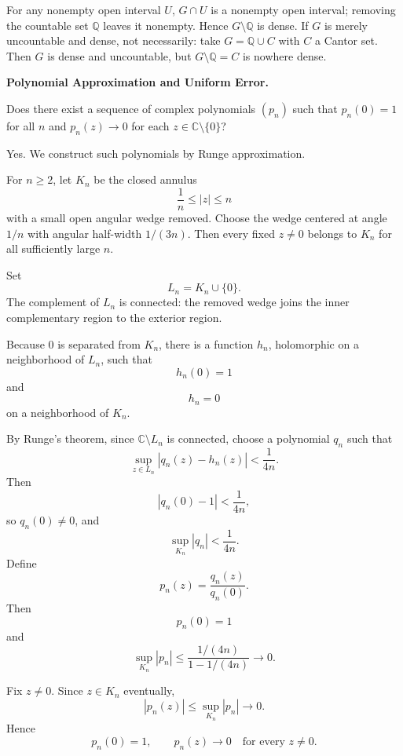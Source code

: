 \begin{solution}
For any nonempty open interval $U$, $G\cap U$ is a nonempty open interval; removing the countable set $\mathbb Q$ leaves it nonempty. Hence $G\setminus\mathbb Q$ is dense.
If $G$ is merely uncountable and dense, not necessarily: take $G=\mathbb Q\cup C$ with $C$ a Cantor set. Then $G$ is dense and uncountable, but $G\setminus\mathbb Q=C$ is nowhere dense.

\bigskip
\end{solution}

\begin{problem}[CP-II-0170]
\label{prob:cp-ii-0170}
\textbf{Polynomial Approximation and Uniform Error.}

	Does there exist a sequence of complex polynomials $(p_n)$ such that
	$p_n(0)=1$ for all $n$ and $p_n(z)\to 0$ for each $z\in\mathbb C\setminus\{0\}$?
\end{problem}

\begin{solution}
Yes. We construct such polynomials by Runge approximation.

For \(n\ge2\), let \(K_n\) be the closed annulus
\[
\frac1n\le|z|\le n
\]
with a small open angular wedge removed. Choose the wedge centered at angle \(1/n\) with
angular half-width \(1/(3n)\). Then every fixed \(z\neq0\) belongs to \(K_n\) for all
sufficiently large \(n\).

Set
\[
L_n=K_n\cup\{0\}.
\]
The complement of \(L_n\) is connected: the removed wedge joins the inner complementary
region to the exterior region.

Because \(0\) is separated from \(K_n\), there is a function \(h_n\), holomorphic on a
neighborhood of \(L_n\), such that
\[
h_n(0)=1
\]
and
\[
h_n=0
\]
on a neighborhood of \(K_n\).

By Runge's theorem, since \(\mathbb C\setminus L_n\) is connected, choose a polynomial
\(q_n\) such that
\[
\sup_{z\in L_n}|q_n(z)-h_n(z)|<\frac1{4n}.
\]
Then
\[
|q_n(0)-1|<\frac1{4n},
\]
so \(q_n(0)\neq0\), and
\[
\sup_{K_n}|q_n|<\frac1{4n}.
\]
Define
\[
p_n(z)=\frac{q_n(z)}{q_n(0)}.
\]
Then
\[
p_n(0)=1
\]
and
\[
\sup_{K_n}|p_n|
\le
\frac{1/(4n)}{1-1/(4n)}
\longrightarrow0.
\]

Fix \(z\neq0\). Since \(z\in K_n\) eventually,
\[
|p_n(z)|\le\sup_{K_n}|p_n|\to0.
\]
Hence
\[
\boxed{
p_n(0)=1,
\qquad
p_n(z)\to0
\quad\text{for every }z\neq0.
}
\]
\end{solution}


